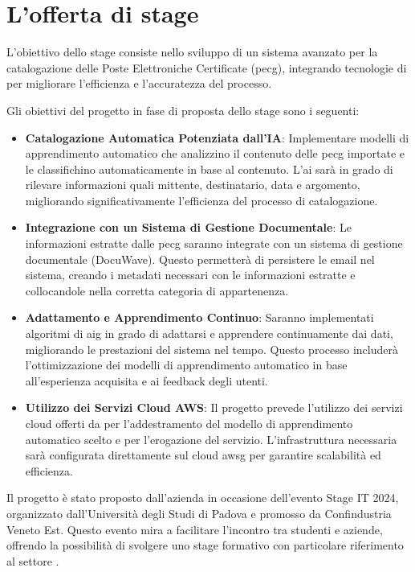 \section{L'offerta di stage}
L'obiettivo dello stage consiste nello sviluppo di un sistema avanzato per la catalogazione delle Poste Elettroniche Certificate (\gls{pecg}), integrando tecnologie di  per migliorare l'efficienza e l'accuratezza del processo.

Gli obiettivi del progetto in fase di proposta dello stage sono i seguenti:

\begin{itemize}
    \item \textbf{Catalogazione Automatica Potenziata dall'IA}: Implementare modelli di apprendimento automatico che analizzino il contenuto delle \gls{pecg} importate e le classifichino automaticamente in base al contenuto. L'\gls{ai} sarà in grado di rilevare informazioni quali mittente, destinatario, data e argomento, migliorando significativamente l'efficienza del processo di catalogazione.
    
    \item \textbf{Integrazione con un Sistema di Gestione Documentale}: Le informazioni estratte dalle \gls{pecg} saranno integrate con un sistema di gestione documentale (DocuWave). Questo permetterà di persistere le email nel sistema, creando i metadati necessari con le informazioni estratte e collocandole nella corretta categoria di appartenenza.
    
    \item \textbf{Adattamento e Apprendimento Continuo}: Saranno implementati algoritmi di \gls{aig} in grado di adattarsi e apprendere continuamente dai dati, migliorando le prestazioni del sistema nel tempo. Questo processo includerà l'ottimizzazione dei modelli di apprendimento automatico in base all'esperienza acquisita e ai feedback degli utenti.
    
    \item \textbf{Utilizzo dei Servizi Cloud AWS}: Il progetto prevede l'utilizzo dei servizi cloud offerti da  per l'addestramento del modello di apprendimento automatico scelto e per l'erogazione del servizio. L'infrastruttura necessaria sarà configurata direttamente sul cloud \gls{awsg} per garantire scalabilità ed efficienza.
\end{itemize}

Il progetto è stato proposto dall'azienda in occasione dell'evento Stage IT 2024, organizzato dall'Università degli Studi di Padova e promosso da Confindustria Veneto Est. Questo evento mira a facilitare l'incontro tra studenti e aziende, offrendo la possibilità di svolgere uno stage formativo con particolare riferimento al settore .

